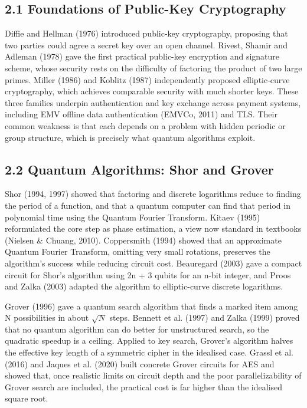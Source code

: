 \documentclass[12pt,oneside]{report}
\begin{document}
\subsection*{2.1 Foundations of Public-Key Cryptography}

Diffie and Hellman (1976) introduced public-key cryptography, proposing that two parties could agree a secret key over an open channel. Rivest, Shamir and Adleman (1978) gave the first practical public-key encryption and signature scheme, whose security rests on the difficulty of factoring the product of two large primes. Miller (1986) and Koblitz (1987) independently proposed elliptic-curve cryptography, which achieves comparable security with much shorter keys. These three families underpin authentication and key exchange across payment systems, including EMV offline data authentication (EMVCo, 2011) and TLS. Their common weakness is that each depends on a problem with hidden periodic or group structure, which is precisely what quantum algorithms exploit.
\par

\subsection*{2.2 Quantum Algorithms: Shor and Grover}

Shor (1994, 1997) showed that factoring and discrete logarithms reduce to finding the period of a function, and that a quantum computer can find that period in polynomial time using the Quantum Fourier Transform. Kitaev (1995) reformulated the core step as phase estimation, a view now standard in textbooks (Nielsen \& Chuang, 2010). Coppersmith (1994) showed that an approximate Quantum Fourier Transform, omitting very small rotations, preserves the algorithm's success while reducing circuit cost. Beauregard (2003) gave a compact circuit for Shor's algorithm using 2n + 3 qubits for an n-bit integer, and Proos and Zalka (2003) adapted the algorithm to elliptic-curve discrete logarithms.
\par

Grover (1996) gave a quantum search algorithm that finds a marked item among N possibilities in about $\sqrt{N}$ steps. Bennett et al. (1997) and Zalka (1999) proved that no quantum algorithm can do better for unstructured search, so the quadratic speedup is a ceiling. Applied to key search, Grover's algorithm halves the effective key length of a symmetric cipher in the idealised case. Grassl et al. (2016) and Jaques et al. (2020) built concrete Grover circuits for AES and showed that, once realistic limits on circuit depth and the poor parallelizability of Grover search are included, the practical cost is far higher than the idealised square root.
\par
\end{document}
